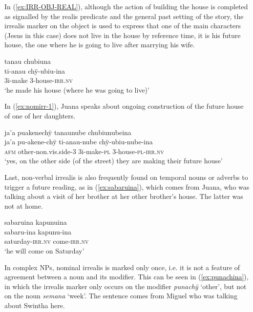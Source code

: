 In (\ref{ex:IRR-OBJ-REAL}), although the action of building the house is completed as signalled by the realis predicate and the general past setting of the story, the irrealis marker on the object is used to express that one of the main characters (Jesus in this case) does not live in the house by reference time, it is his future house, the one where he is going to live after marrying his wife.

\ea\label{ex:IRR-OBJ-REAL}
\begingl 
\glpreamble tanau chubiuna\\
\gla ti-anau chÿ-ubiu-ina\\ 
\glb 3i-make 3-house-\textsc{irr.nv}\\ 
\glft ‘he made his house (where he was going to live)’
\trailingcitation{[jxx-n101013s-1.552]}
\xe

In (\ref{ex:nomirr-1}), Juana speaks about ongoing construction of the future house of one of her daughters.

\ea\label{ex:nomirr-1}
\begingl
\glpreamble ja’a puakenechÿ tanaunube chubiunubeina\\
\gla ja’a pu-akene-chÿ ti-anau-nube chÿ-ubiu-nube-ina\\
\glb \textsc{afm} other-non.vis.side-3 3i-make-\textsc{pl} 3-house-\textsc{pl}-\textsc{irr.nv}\\
\glft ‘yes, on the other side (of the street) they are making their future house’
\endgl
\trailingcitation{[jxx-p110923l-2.154]}
\xe


Last, non-verbal irrealis is also frequently found on temporal nouns or adverbs to trigger a future reading, as in (\ref{ex:sabaruina}), which comes from Juana, who was talking about a visit of her brother at her other brother’s house. The latter was not at home.

\ea\label{ex:sabaruina}
\begingl 
\glpreamble sabaruina kapunuina\\
\gla sabaru-ina kapunu-ina\\ 
\glb saturday-\textsc{irr.nv} come-\textsc{irr.nv}\\ 
\glft ‘he will come on Saturday’
\trailingcitation{[jxx-p120430l-2.411]}
\xe

In complex NPs, nominal irrealis is marked only once, i.e. it is not a feature of agreement between a noun and its modifier. This can be seen in (\ref{ex:punachina}), in which the irrealis marker only occurs on the modifier \textit{punachÿ} ‘other’, but not on the noun \textit{semana} ‘week’. The sentence comes from Miguel who was talking about Swintha here.

